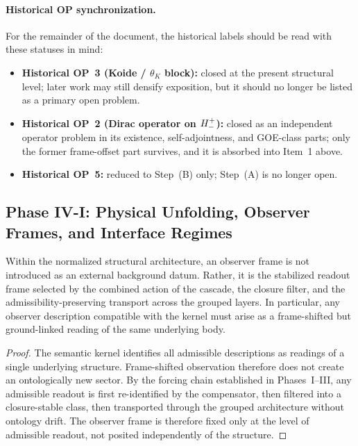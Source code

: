 \paragraph{Historical OP synchronization.}
For the remainder of the document, the historical labels should be read with
these statuses in mind:
\begin{itemize}[leftmargin=2em]
 \item \textbf{Historical OP~3 (Koide / $\theta_K$ block):} closed at the
 present structural level; later work may still densify exposition, but
 it should no longer be listed as a primary open problem.
 \item \textbf{Historical OP~2 (Dirac operator on $H^+_-$):} closed as
 an independent operator problem in its existence, self-adjointness,
 and GOE-class parts; only the former frame-offset part survives, and
 it is absorbed into Item~1 above.
 \item \textbf{Historical OP~5:} reduced to Step~(B) only; Step~(A) is no
 longer open.
\end{itemize}




\subsection*{Phase IV-I: Physical Unfolding, Observer Frames, and Interface Regimes}

\begin{lemma}
\label{lem:observer-frame-lemma}
Within the normalized structural architecture, an observer frame is not introduced as an external background datum. Rather, it is the stabilized readout frame selected by the combined action of the cascade, the closure filter, and the admissibility-preserving transport across the grouped layers. In particular, any observer description compatible with the kernel must arise as a frame-shifted but ground-linked reading of the same underlying body.
\end{lemma}

\begin{proof}
The semantic kernel identifies all admissible descriptions as readings of a single underlying structure. Frame-shifted observation therefore does not create an ontologically new sector. By the forcing chain established in Phases~I--III, any admissible readout is first re-identified by the compensator, then filtered into a closure-stable class, then transported through the grouped architecture without ontology drift. The observer frame is therefore fixed only at the level of admissible readout, not posited independently of the structure.
\end{proof}


